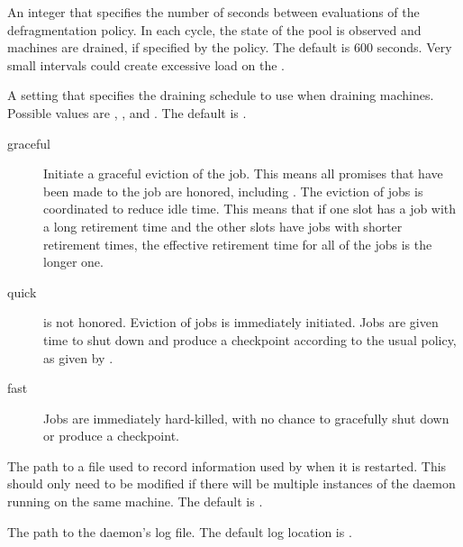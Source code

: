 \begin{description}
\label{param:DefragInterval}
\item[\Macro{DEFRAG\_INTERVAL}] An integer that specifies the number
  of seconds between evaluations of the defragmentation policy.  
  In each cycle, the state of the pool is observed and machines are drained, 
  if specified by the policy.  
  The default is 600 seconds.  
  Very small intervals could create excessive load on the .

\label{param:DefragSchedule}
\item[\Macro{DEFRAG\_SCHEDULE}] A setting that specifies the draining
  schedule to use when draining machines.  
  Possible values are , , and .
  The default is .

\begin{description}
  \item[graceful] Initiate a graceful eviction of the job.  This means
  all promises that have been made to the job are honored, including
  .  The eviction of jobs is coordinated
  to reduce idle time.  This means that if one slot has a job with a long
  retirement time and the other slots have jobs with shorter retirement times,
  the effective retirement time for all of the jobs is the longer one.

  \item[quick]  is not honored.  Eviction
  of jobs is immediately initiated.  Jobs are given time to shut down
  and produce a checkpoint according to the usual policy,
  as given by .

  \item[fast] Jobs are immediately hard-killed, with no chance to
  gracefully shut down or produce a checkpoint.
\end{description}

\label{param:DefragStateFile}
\item[\Macro{DEFRAG\_STATE\_FILE}] The path to a file used to record
  information used by  when it is restarted.  
  This should only need to be modified if there will be multiple instances of
  the  daemon running on the same machine.  
  The default is .

\label{param:DefragLog}
\item[\Macro{DEFRAG\_LOG}] The path to the  daemon's log file.
  The default log location is .

\end{description}

